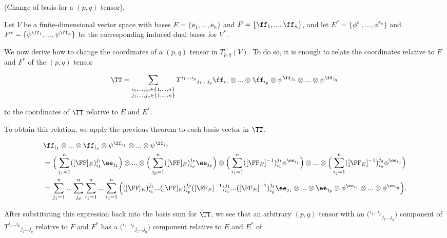 \begin{theorem}
\label{ch::bilinear_forms_metric_tensors::thm::ricci}

    (Change of basis for a $(p, q)$ tensor). 
    
    Let $V$ be a finite-dimensional vector space with bases $E = \{\ee_1, ..., \ee_n\}$ and $F = \{\ff_1, ..., \ff_n\}$, and let $E^* = \{\phi^{\ee_1}, ..., \phi^{\ee_n}\}$ and $F^* = \{\psi^{\ff_1}, ..., \psi^{\ff_n}\}$ be the corresponding induced dual bases for $V^*$.
    
    We now derive how to change the coordinates of a $(p, q)$ tensor in $T_{p,q}(V)$. To do so, it is enough to relate the coordinates relative to $F$ and $F^*$ of the $(p, q)$ tensor

    \begin{align*}
       \TT = \sum_{\substack{i_1, ..., i_p \in \{1, ..., n\} \\ j_1, ..., j_q \in \{1, ..., n\}}}
       T^{i_1 ... i_p}{}_{j_1 ... j_q} \ff_{i_1} \otimes ... \otimes \ff_{i_p} \otimes \psi^{\ff_{j_1}} \otimes ... \otimes \psi^{\ff_{j_q}}
    \end{align*}
    
    to the coordinates of $\TT$ relative to $E$ and $E^*$.
    
    To obtain this relation, we apply the previous theorem to each basis vector in $\TT$.
    
    \begin{align*}
        &\ff_{i_1} \otimes ... \otimes \ff_{i_p} \otimes \psi^{\ff_{j_1}} \otimes ... \otimes \psi^{\ff_{j_q}} \\
        &= \Big(\sum_{j_1 = 1}^n ([\FF]_E)^{j_1}_{i_1} \ee_{j_1} \Big) \otimes ... \otimes \Big(\sum_{j_p = 1}^n ([\FF]_E)^{j_p}_{i_p} \ee_{j_p} \Big)
        \otimes
        \Big( \sum_{i_1 = 1}^n ([\FF_E]^{-1})^{j_1}_{i_1} \phi^{\ee_{i_1}} \Big) \otimes
        ... \otimes \Big( \sum_{i_q = 1}^n ([\FF_E]^{-1})^{j_q}_{i_q} \phi^{\ee_{i_q}} \Big) \\
        &= \sum_{j_1 = 1}^n ... \sum_{j_p}^n \sum_{i_1 = 1}^n ... \sum_{i_q = 1}^n \Big( ([\FF]_E)^{j_1}_{i_1} ... ([\FF]_E)^{j_p}_{i_p}
        ([\FF_E]^{-1})^{j_1}_{i_1} ... ([\FF_E]^{-1})^{j_q}_{i_q} 
        \ee_{j_1} \otimes ... \otimes \ee_{j_p} \otimes \phi^{\ee_{i_1}} \otimes ... \otimes \phi^{\ee_{i_q}} \Big).
    \end{align*}
    
    After substituting this expression back into the basis sum for $\TT$, we see that an arbitrary $(p, q)$ tensor with an $\Big( {}^{i_1 ... i_p}{}_{j_1 ... j_q} \Big)$ component of $T^{i_1 ... i_p}{}_{j_1 ... j_q}$ relative to $F$ and $F^*$ has a $\Big( {}^{i_1 ... i_p}{}_{j_1 ... j_q} \Big)$ component relative to $E$ and $E^*$ of 
    

\end{theorem}
